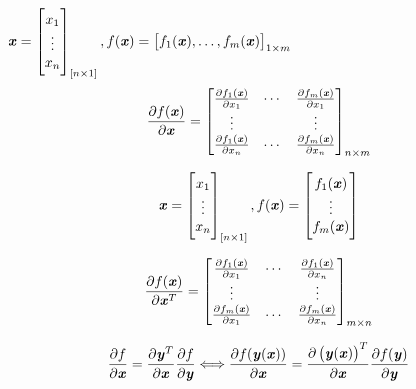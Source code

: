 \begin{definition}
    $\vxx_{[n \times 1]}, f(\Vx) =  \left[  f_1(\Vx), \ldots, f_m(\Vx)\right]_{1 \times m}$
    \[
        \frac{\partial f(\Vx)}{\partial \Vx} = \begin{bmatrix}
            \frac{\partial f_1(\Vx)}{\partial x_1} & \cdots & \frac{\partial f_m(\Vx)}{\partial x_1} \\
            \vdots & & \vdots \\
            \frac{\partial f_1(\Vx)}{\partial x_n} & \cdots & \frac{\partial f_m(\Vx)}{\partial x_n}
        \end{bmatrix}_{n \times m}
    \]
\end{definition}

\begin{definition}[Jacobi 矩阵]
    \[
        \vxx_{[n \times 1]}, f(\Vx) = \begin{bmatrix}
            f_1(\Vx) \\
            \vdots \\
            f_m(\Vx)
        \end{bmatrix}
    \]

    \[
        \frac{\partial f(\Vx)}{\partial \Vx^T} = \begin{bmatrix}
            \frac{\partial f_1(\Vx)}{\partial x_1} & \cdots & \frac{\partial f_1(\Vx)}{\partial x_n} \\
            \vdots & & \vdots \\
            \frac{\partial f_m(\Vx)}{\partial x_1} & \cdots & \frac{\partial f_m(\Vx)}{\partial x_n}
        \end{bmatrix}_{m \times n}
    \]
\end{definition}

\begin{theorem}[链式法则]
    \[
        \frac{\partial f}{\partial \Vx} = \frac{\partial \Vy^T}{\partial \Vx} \frac{\partial f}{\partial \Vy}
        \Longleftrightarrow
        \frac{\partial f(\Vy(\Vx))}{\partial \Vx} = \frac{\partial \left(\Vy(\Vx)\right)^T}{\partial \Vx} \frac{\partial f(\Vy)}{\partial \Vy}
    \]
\end{theorem}

